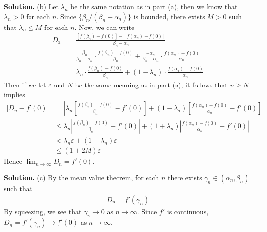 \documentclass[12pt]{article}
\theoremstyle{definition}
\begin{document}
\smallskip
\noindent\textbf{Solution.}\quad
(b) Let $\lambda_n$ be the same notation as in part (a), then we know that $\lambda_n>0$ for each $n$. Since $\{\beta_n/(\beta_n-\alpha_n)\}$ is bounded, there exists $M>0$ such that $\lambda_n\le M$ for each $n$. Now, we can write
\begin{align*}
D_n
&=\frac{\left[f(\beta_n)-f(0)\right]-\left[f(\alpha_n)-f(0)\right]}{\beta_n-\alpha_n} \\
&=\frac{\beta_n}{\beta_n-\alpha_n}\cdot\frac{f(\beta_n)-f(0)}{\beta_n}
+\frac{-\alpha_n}{\beta_n-\alpha_n}\cdot\frac{f(\alpha_n)-f(0)}{\alpha_n} \\
&=\lambda_n\cdot\frac{f(\beta_n)-f(0)}{\beta_n}
+(1-\lambda_n)\cdot\frac{f(\alpha_n)-f(0)}{\alpha_n}
\end{align*}
Then if we let $\varepsilon$ and $N$ be the same meaning as in part (a), it follows that $n\ge N$ implies
\begin{align*}
\left\vert D_n-f'(0)\right\vert
&=\left\vert \lambda_n\left[\frac{f(\beta_n)-f(0)}{\beta_n}-f'(0)\right]
+(1-\lambda_n)\left[\frac{f(\alpha_n)-f(0)}{\alpha_n}-f'(0)\right]\right\vert \\
&\le\lambda_n\left\vert\frac{f(\beta_n)-f(0)}{\beta_n}-f'(0)\right\vert
+(1+\lambda_n)\left\vert\frac{f(\alpha_n)-f(0)}{\alpha_n}-f'(0)\right\vert \\
&<\lambda_n\varepsilon+\left(1+\lambda_n\right)\varepsilon \\
&\le\left(1+2M\right)\varepsilon
\end{align*}
Hence $\lim_{n\to\infty}D_n=f'(0)$.

\smallskip
\noindent\textbf{Solution.}\quad
(c) By the mean value theorem, for each $n$ there exists $\gamma_n\in(\alpha_n,\beta_n)$ such that
\begin{align*}
D_n=f'(\gamma_n)
\end{align*}
By squeezing, we see that $\gamma_n\to 0$ as $n\to\infty$. Since $f'$ is continuous, $D_n=f'(\gamma_n)\to f'(0)$ as $n\to\infty$.
\end{document}
